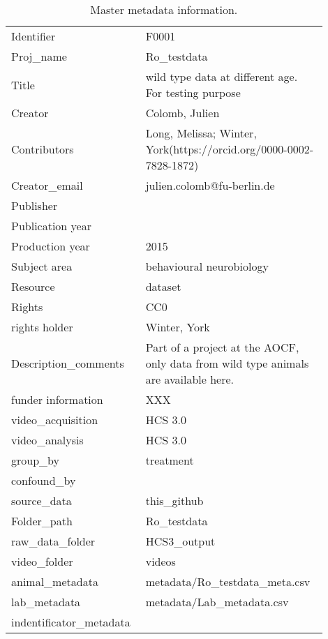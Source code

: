\begin{table}[!htpb]
\centering
\begin{tabular}{|p{0.35\linewidth}|p{0.55\linewidth}|}
  \hline
  \hline
Identifier & F0001 \\ 
  Proj\_name & Ro\_testdata \\ 
  Title & wild type data at different age. For testing purpose \\ 
  Creator & Colomb, Julien \\ 
  Contributors & Long, Melissa; Winter, York(https://orcid.org/0000-0002-7828-1872) \\ 
  Creator\_email & julien.colomb@fu-berlin.de \\ 
  Publisher &  \\ 
  Publication year &  \\ 
  Production year & 2015 \\ 
  Subject area & behavioural neurobiology \\ 
  Resource & dataset \\ 
  Rights & CC0 \\ 
  rights holder & Winter, York \\ 
  Description\_comments & Part of a project at the AOCF, only data from wild type animals are available here. \\ 
  funder information & XXX \\ 
  video\_acquisition & HCS 3.0 \\ 
  video\_analysis & HCS 3.0 \\ 
  group\_by & treatment \\ 
  confound\_by &  \\ 
  source\_data & this\_github \\ 
  Folder\_path & Ro\_testdata \\ 
  raw\_data\_folder & HCS3\_output \\ 
  video\_folder & videos \\ 
  animal\_metadata & metadata/Ro\_testdata\_meta.csv \\ 
  lab\_metadata & metadata/Lab\_metadata.csv \\ 
  indentificator\_metadata &  \\ 
   \hline
\end{tabular}
\caption{Master metadata information.} 
\label{tab:project_metadata}
\end{table}
